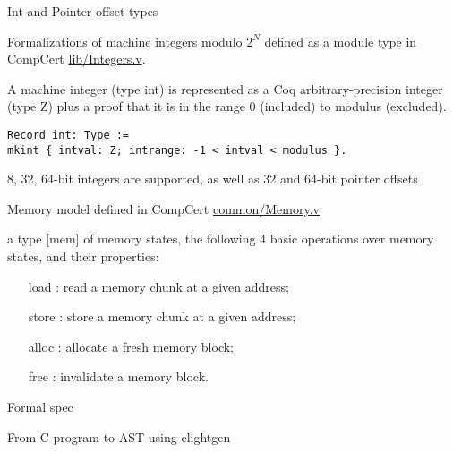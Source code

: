 \documentclass{beamer}
\begin{document}
\begin{frame}[t,fragile]{Int and Pointer offset types}

Formalizations of machine integers modulo $2^N$ defined as a module type in CompCert \url{lib/Integers.v}.\\

\bigskip

A machine integer (type int) is represented as a Coq arbitrary-precision
integer (type Z) plus a proof that it is in the range 0 (included) to
modulus (excluded).

\bigskip

\begin{lstlisting}[language=Coq]
Record int: Type :=
mkint { intval: Z; intrange: -1 < intval < modulus }.
\end{lstlisting}

8, 32, 64-bit integers are supported, as well as 32 and 64-bit pointer offsets

\end{frame}

\begin{frame}{Memory model}
defined in CompCert \url{common/Memory.v}

\bigskip
a type [mem] of memory states, the following 4 basic
operations over memory states, and their properties:
\begin{itemize}
\item [load]: read a memory chunk at a given address;
\item [store]: store a memory chunk at a given address;
\item [alloc]: allocate a fresh memory block;
\item [free]: invalidate a memory block.
\end{itemize}
\end{frame}

\begin{frame}{Formal spec}
     
\end{frame}

\begin{frame}{From C program to AST using clightgen}



\end{frame}{}
\end{document}
